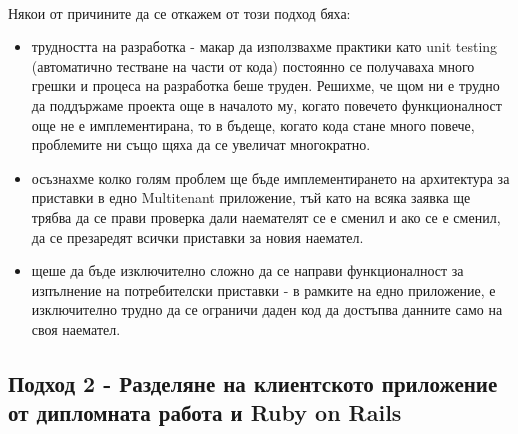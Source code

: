 \documentclass[pdftex,14pt,a4paper]{extreport}
\begin{document}
\paragraph {}

Някои от причините да се откажем от този подход бяха:
\begin{itemize}
  \item трудността на разработка - макар да използвахме практики като unit testing (автоматично тестване на части от кода) постоянно се получаваха много грешки и процеса на разработка беше труден. Решихме, че щом ни е трудно да поддържаме проекта още в началото му, когато повечето функционалност още не е имплементирана, то в бъдеще, когато кода стане много повече, проблемите ни също щяха да се увеличат многократно.
  \item осъзнахме колко голям проблем ще бъде имплементирането на архитектура за приставки в едно Multitenant приложение, тъй като на всяка заявка ще трябва да се прави проверка дали наемателят се е сменил и ако се е сменил, да се презаредят всички приставки за новия наемател.
  \item щеше да бъде изключително сложно да се направи функционалност за изпълнение на потребителски приставки - в рамките на едно приложение, е изключително трудно да се ограничи даден код да достъпва данните само на своя наемател.
\end{itemize}
\subsection {Подход 2 - Разделяне на клиентското приложение от дипломната работа и Ruby on Rails}
\end{document}

